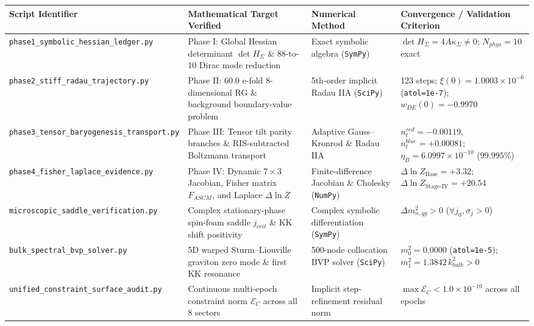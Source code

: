 \documentclass[aps,prd,onecolumn,superscriptaddress,nofootinbib,longbibliography,10pt]{revtex4-2}
\begin{document}
  
\begin{center}
\begin{tabular}{|llll|}
\hline

      Script Identifier & Mathematical Target Verified & Numerical Method & Convergence / Validation Criterion
       \\ \hline

    
    
      \texttt{phase1_symbolic_hessian_ledger.py} & Phase I: Global Hessian determinant \(\det H_\Sigma\) \& 88-to-10 Dirac mode reduction & Exact symbolic algebra (\texttt{SymPy}) & \(\det H_\Sigma = 4A\kappa_\Sigma \neq 0\); \(N_{phys} = 10\) exact \\ \hline

      \texttt{phase2_stiff_radau_trajectory.py} & Phase II: 60.0 e-fold 8-dimensional RG \& background boundary-value problem & 5th-order implicit Radau IIA (\texttt{SciPy}) & 123 steps; \(\xi(0) = 1.0003 \times 10^{-6}\) (\texttt{atol=1e-7}); \(w_{DE}(0) = -0.9970\) \\ \hline

      \texttt{phase3_tensor_baryogenesis_transport.py} & Phase III: Tensor tilt parity branches \& RIS-subtracted Boltzmann transport & Adaptive Gauss–Kronrod \& Radau IIA & \(n_t^{red} = -0.00119\), \(n_t^{blue} = +0.00081\); \(\eta_B = 6.0997 \times 10^{-10}\) (\(99.995\%\)) \\ \hline

      \texttt{phase4_fisher_laplace_evidence.py} & Phase IV: Dynamic \(7 \times 3\) Jacobian, Fisher matrix \(F_{ASCM}\), and Laplace \(\Delta\ln Z\) & Finite-difference Jacobian \& Cholesky (\texttt{NumPy}) & \(\Delta\ln Z_{\text{Base}} = +3.32\); \(\Delta\ln Z_{\text{Stage-IV}} = +20.54\) \\ \hline

      \texttt{microscopic_saddle_verification.py} & Complex stationary-phase spin-foam saddle \(j_{crit}\) \& KK shift positivity & Complex symbolic differentiation (\texttt{SymPy}) & \(\Delta m_{n,qg}^2 > 0\) (\(\forall j_0, \sigma_j > 0\)) \\ \hline

      \texttt{bulk_spectral_bvp_solver.py} & 5D warped Sturm–Liouville graviton zero mode \& first KK resonance & 500-node collocation BVP solver (\texttt{SciPy}) & \(m_0^2 = 0.0000\) (\texttt{atol=1e-5}); \(m_1^2 = 1.3842\,k_{bulk}^2 > 0\) \\ \hline

      \texttt{unified_constraint_surface_audit.py} & Continuous multi-epoch constraint norm \(\mathcal{E}_C\) across all 8 sectors & Implicit step-refinement residual norm & \(\max\mathcal{E}_C < 1.0 \times 10^{-10}\) across all epochs \\ \hline



\end{tabular}
\end{center}
\end{document}
